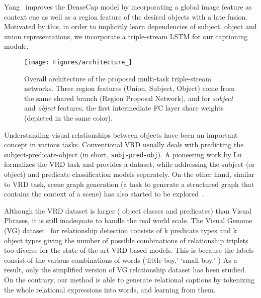 \documentclass[10pt,twocolumn,letterpaper]{article}
\begin{document}
Yang~\etal\cite{Yang_2017_CVPR} improves the DenseCap model by incorporating a global image feature as context cue as well as a region feature of the desired objects with a late fusion.
Motivated by this, 
in order to implicitly learn dependencies of subject, object and union representations, we incorporate a triple-stream LSTM for our captioning module.


\begin{figure*}[t]
\vspace{-2mm}\begin{center}		\texttt{[image: Figures/architecture\_]}
	\end{center}
	\vspace{-6mm}
	\caption{Overall architecture of the proposed multi-task triple-stream networks. 
Three region features (Union, Subject, Object) come from the same shared branch (Region Proposal Network), and for \emph{subject} and \emph{object} features, the first intermediate FC layer share weights (depicted in the same color).\vspace{-3mm}
    }
	\label{fig:architecture}
\end{figure*}


Understanding visual relationships between objects have been an important concept in various tasks.
Conventional VRD usually deals with predicting the subject-predicate-object (in short, \texttt{subj-pred-obj}).
A pioneering work by Lu~\etal\cite{lu2016visual} formalizes the VRD task and provides a dataset, while addressing the subject (or object) and predicate classification models separately.
{On the other hand, similar to VRD task, scene graph generation (a task to generate a structured graph that contains the context of a scene) has also started to be explored~\cite{li2017scene,woo2018linknet,xu2017scene,zellers2018neural}. }

Although the VRD dataset is larger ( object classes and  predicates) than Visual Phrases, it is still inadequate to handle the real world scale.
The Visual Genome (VG) dataset~\cite{krishna2017visual} for relationship detection consists of k predicate types and k object types giving the number of possible combinations of relationship triplets too diverse for the state-of-the-art VRD based models.
{This is because the labels consist of the various combinations of words (\eg `little boy,' `small boy,' \etc)}
As a result, only the simplified version of VG relationship dataset has been studied. 
On the contrary, our method is able to generate relational captions by tokenizing the whole relational expressions into words, and learning from them.
\end{document}
